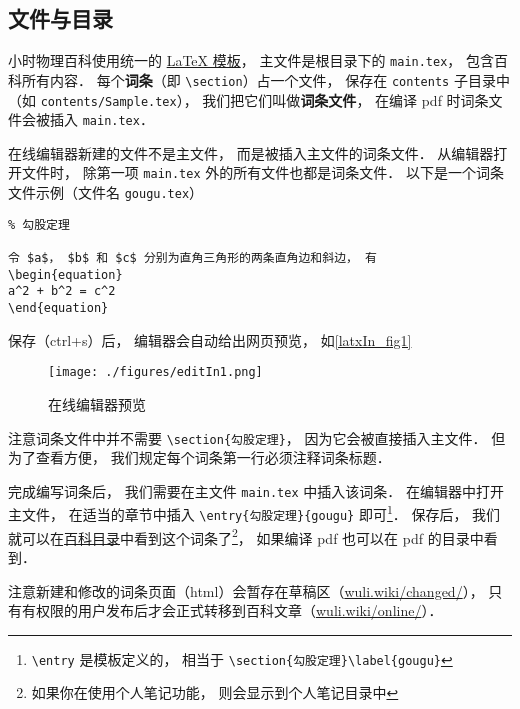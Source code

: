 

\subsection{文件与目录}

小时物理百科使用统一的 \href{https://github.com/MacroUniverse/PhysWiki}{LaTeX 模板}， 主文件是根目录下的 \lstinline|main.tex|， 包含百科所有内容． 每个\textbf{词条}（即 \lstinline|\section|）占一个文件， 保存在 \lstinline|contents| 子目录中 （如 \lstinline|contents/Sample.tex|）， 我们把它们叫做\textbf{词条文件}， 在编译 pdf 时词条文件会被插入 \lstinline|main.tex|．

在线编辑器新建的文件不是主文件， 而是被插入主文件的词条文件． 从编辑器打开文件时， 除第一项 \lstinline|main.tex| 外的所有文件也都是词条文件． 以下是一个词条文件示例（文件名 \lstinline|gougu.tex|）

\begin{lstlisting}
% 勾股定理

令 $a$， $b$ 和 $c$ 分别为直角三角形的两条直角边和斜边， 有
\begin{equation}
a^2 + b^2 = c^2
\end{equation}
\end{lstlisting}
保存（ctrl+s）后， 编辑器会自动给出网页预览， 如\autoref{latxIn_fig1}
\begin{figure}[ht]
\centering
\texttt{[image: ./figures/editIn1.png]}
\caption{在线编辑器预览} \label{editIn_fig1}
\end{figure}

注意词条文件中并不需要 \lstinline|\section{勾股定理}|， 因为它会被直接插入主文件． 但为了查看方便， 我们规定每个词条第一行必须注释词条标题．

完成编写词条后， 我们需要在主文件 \lstinline|main.tex| 中插入该词条． 在编辑器中打开主文件， 在适当的章节中插入 \lstinline|\entry{勾股定理}{gougu}| 即可\footnote{\lstinline|\entry| 是模板定义的， 相当于 \lstinline|\section{勾股定理}\label{gougu}|}． 保存后， 我们就可以在\href{http://wuli.wiki/changed}{百科目录}中看到这个词条了\footnote{如果你在使用个人笔记功能， 则会显示到个人笔记目录中}， 如果编译 pdf 也可以在 pdf 的目录中看到．

注意新建和修改的词条页面（html）会暂存在草稿区（\href{http://wuli.wiki/changed/}{wuli.wiki/changed/}）， 只有有权限的用户发布后才会正式转移到百科文章（\href{http://wuli.wiki/online/}{wuli.wiki/online/}）．
